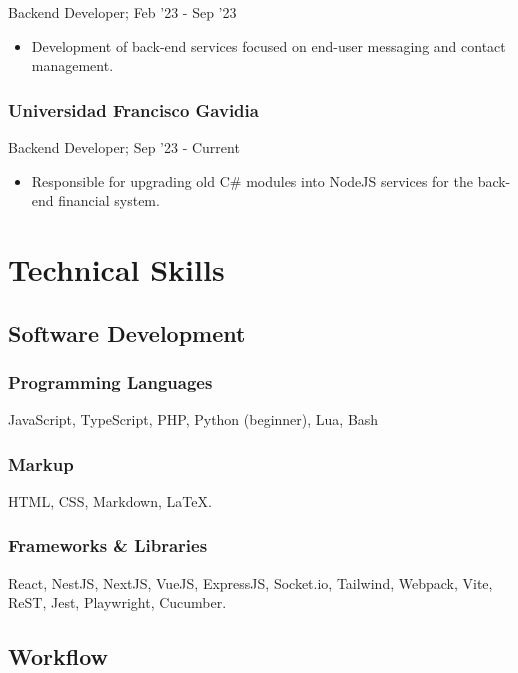 \documentclass[letterpaper]{article}
\begin{document}
Backend Developer; Feb '23 - Sep '23

\begin{itemize}
  \item Development of back-end services focused on end-user messaging and contact management.
\end{itemize}

\subsubsection{Universidad Francisco Gavidia}

Backend Developer; Sep '23 - Current

\begin{itemize}
  \item Responsible for upgrading old C\# modules into NodeJS services for the back-end financial system.
\end{itemize}

\section{Technical Skills}

\subsection{Software Development}

\subsubsection{Programming Languages}

JavaScript, TypeScript, PHP, Python (beginner), Lua, Bash

\subsubsection{Markup}

HTML, CSS, Markdown, \LaTeX{}.

\subsubsection{Frameworks \& Libraries}

React, NestJS, NextJS, VueJS, ExpressJS, Socket.io, Tailwind, Webpack, Vite, ReST, Jest, Playwright, Cucumber.

\subsection{Workflow}
\end{document}
